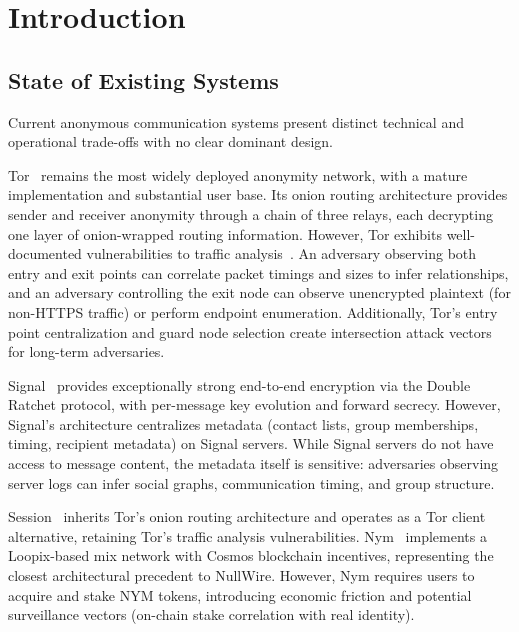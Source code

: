 \documentclass[11pt]{article}
\theoremstyle{definition}
\theoremstyle{remark}
\begin{document}
\newpage

\tableofcontents

\newpage

\section{Introduction}\label{sec:intro}

\subsection{State of Existing Systems}

Current anonymous communication systems present distinct technical and operational trade-offs with no clear dominant design.

Tor~\cite{tor2004} remains the most widely deployed anonymity network, with a mature implementation and substantial user base. Its onion routing architecture provides sender and receiver anonymity through a chain of three relays, each decrypting one layer of onion-wrapped routing information. However, Tor exhibits well-documented vulnerabilities to traffic analysis~\cite{loopix2017}. An adversary observing both entry and exit points can correlate packet timings and sizes to infer relationships, and an adversary controlling the exit node can observe unencrypted plaintext (for non-HTTPS traffic) or perform endpoint enumeration. Additionally, Tor's entry point centralization and guard node selection create intersection attack vectors for long-term adversaries.

Signal~\cite{signal-protocol} provides exceptionally strong end-to-end encryption via the Double Ratchet protocol, with per-message key evolution and forward secrecy. However, Signal's architecture centralizes metadata (contact lists, group memberships, timing, recipient metadata) on Signal servers. While Signal servers do not have access to message content, the metadata itself is sensitive: adversaries observing server logs can infer social graphs, communication timing, and group structure.

Session~\cite{session2025} inherits Tor's onion routing architecture and operates as a Tor client alternative, retaining Tor's traffic analysis vulnerabilities. Nym~\cite{nym2020} implements a Loopix-based mix network with Cosmos blockchain incentives, representing the closest architectural precedent to NullWire. However, Nym requires users to acquire and stake NYM tokens, introducing economic friction and potential surveillance vectors (on-chain stake correlation with real identity).
\end{document}
